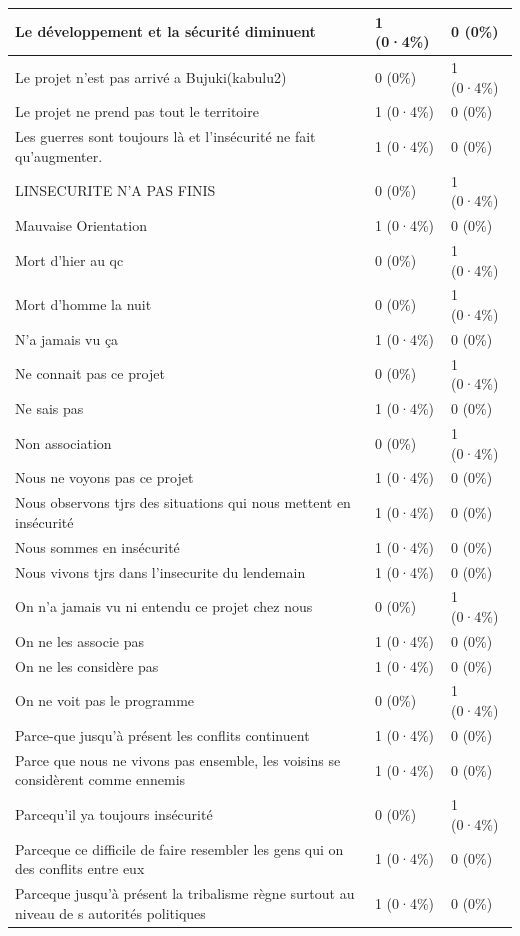\documentclass[
]{book}
\begin{document}
\begin{tabular}{l|l|l}
\hline
Le développement et la sécurité diminuent & 1 (0·4\%) & 0 (0\%)\\
\hline
Le projet n'est pas arrivé a Bujuki(kabulu2) & 0 (0\%) & 1 (0·4\%)\\
\hline
Le projet ne prend pas tout le territoire & 1 (0·4\%) & 0 (0\%)\\
\hline
Les guerres sont toujours là et l'insécurité ne fait qu'augmenter. & 1 (0·4\%) & 0 (0\%)\\
\hline
LINSECURITE N'A PAS FINIS & 0 (0\%) & 1 (0·4\%)\\
\hline
Mauvaise Orientation & 1 (0·4\%) & 0 (0\%)\\
\hline
Mort d'hier au qc & 0 (0\%) & 1 (0·4\%)\\
\hline
Mort d'homme la nuit & 0 (0\%) & 1 (0·4\%)\\
\hline
N'a jamais vu ça & 1 (0·4\%) & 0 (0\%)\\
\hline
Ne connait pas ce projet & 0 (0\%) & 1 (0·4\%)\\
\hline
Ne sais pas & 1 (0·4\%) & 0 (0\%)\\
\hline
Non association & 0 (0\%) & 1 (0·4\%)\\
\hline
Nous ne voyons pas ce projet & 1 (0·4\%) & 0 (0\%)\\
\hline
Nous observons tjrs des situations qui nous mettent en insécurité & 1 (0·4\%) & 0 (0\%)\\
\hline
Nous sommes en insécurité & 1 (0·4\%) & 0 (0\%)\\
\hline
Nous vivons tjrs dans l'insecurite du lendemain & 1 (0·4\%) & 0 (0\%)\\
\hline
On n'a jamais vu ni entendu ce projet chez nous & 0 (0\%) & 1 (0·4\%)\\
\hline
On ne les associe pas & 1 (0·4\%) & 0 (0\%)\\
\hline
On ne les considère pas & 1 (0·4\%) & 0 (0\%)\\
\hline
On ne voit pas le programme & 0 (0\%) & 1 (0·4\%)\\
\hline
Parce-que jusqu'à présent les conflits continuent & 1 (0·4\%) & 0 (0\%)\\
\hline
Parce que nous ne vivons pas ensemble, les voisins se considèrent comme ennemis & 1 (0·4\%) & 0 (0\%)\\
\hline
Parcequ'il ya toujours insécurité & 0 (0\%) & 1 (0·4\%)\\
\hline
Parceque ce difficile de faire resembler les gens qui on des conflits entre eux & 1 (0·4\%) & 0 (0\%)\\
\hline
Parceque jusqu'à présent la tribalisme règne surtout au niveau de s autorités politiques & 1 (0·4\%) & 0 (0\%)\\

\end{tabular}
\end{document}
